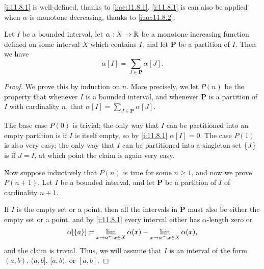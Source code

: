 \begin{note}
  \cref{i:11.8.1} is well-defined, thanks to \cref{i:ac:11.8.1}.
  \cref{i:11.8.1} is can also be applied when \(\alpha\) is monotone decreasing, thanks to \cref{i:ac:11.8.2}.
\end{note}

\setcounter{thm}{3}
\begin{lem}\label{i:11.8.4}
  Let \(I\) be a bounded interval, let \(\alpha : X \to \mathbb{R}\) be a monotone increasing function defined on some interval \(X\) which contains \(I\), and let \(\mathbf{P}\) be a partition of \(I\).
  Then we have
  \[
    \alpha[I] = \sum_{J \in \mathbf{P}} \alpha[J].
  \]
\end{lem}

\begin{proof}
  We prove this by induction on \(n\).
  More precisely, we let \(P(n)\) be the property that whenever \(I\) is a bounded interval, and whenever \(\mathbf{P}\) is a partition of \(I\) with cardinality \(n\), that \(\alpha[I] = \sum_{J \in \mathbf{P}} \alpha[J]\).

  The base case \(P(0)\) is trivial;
  the only way that \(I\) can be partitioned into an empty partition is if \(I\) is itself empty, so by \cref{i:11.8.1} \(\alpha[I] = 0\).
  The case \(P(1)\) is also very easy;
  the only way that \(I\) can be partitioned into a singleton set \(\left\lbrace J\right\rbrace\) is if \(J = I\), at which point the claim is again very easy.

  Now suppose inductively that \(P(n)\) is true for some \(n \geq 1\), and now we prove \(P(n + 1)\).
  Let \(I\) be a bounded interval, and let \(\mathbf{P}\) be a partition of \(I\) of cardinality \(n + 1\).

  If \(I\) is the empty set or a point, then all the intervals in \(\mathbf{P}\) must also be either the empty set or a point, and by \cref{i:11.8.1} every interval either has \(\alpha\)-length zero or
  \[
    \alpha[\left\lbrace a\right\rbrace] = \lim_{x \to a^+ ; x \in X} \alpha(x) - \lim_{x \to a^- ; x \in X} \alpha(x),
  \]
  and the claim is trivial.
  Thus, we will assume that \(I\) is an interval of the form \((a, b)\), \((a, b]\), \([a, b)\), or \([a, b]\).


\end{proof}
